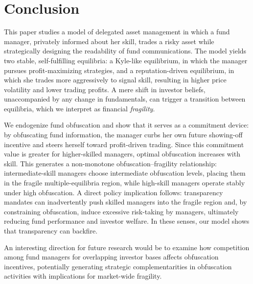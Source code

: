 \section{Conclusion} \label{sec:conclusion}
This paper studies a model of delegated asset management in which a fund manager, privately informed about her skill, trades a risky asset while strategically designing the readability of fund communications. The model yields two stable, self-fulfilling equilibria: a Kyle-like equilibrium, in which the manager pursues profit-maximizing strategies, and a reputation-driven equilibrium, in which she trades more aggressively to signal skill, resulting in higher price volatility and lower trading profits. A mere shift in investor beliefs, unaccompanied by any change in fundamentals, can trigger a transition between equilibria, which we interpret as financial \textit{fragility}. 

We endogenize fund obfuscation and show that it serves as a commitment device: by obfuscating fund information, the manager curbs her own future showing-off incentive and steers herself toward profit-driven trading. Since this commitment value is greater for higher-skilled managers, optimal obfuscation increases with skill. This generates a non-monotone obfuscation--fragility relationship: intermediate-skill managers choose intermediate obfuscation levels, placing them in the fragile multiple-equilibria region, while high-skill managers operate stably under high obfuscation. A direct policy implication follows: transparency mandates can inadvertently push skilled managers into the fragile region and, by constraining obfuscation, induce excessive risk-taking by managers, ultimately reducing fund performance and investor welfare. In these senses, our model shows that transparency can backfire.

An interesting direction for future research would be to examine how competition among fund managers for overlapping investor bases affects obfuscation incentives, potentially generating strategic complementarities in obfuscation activities with implications for market-wide fragility.


